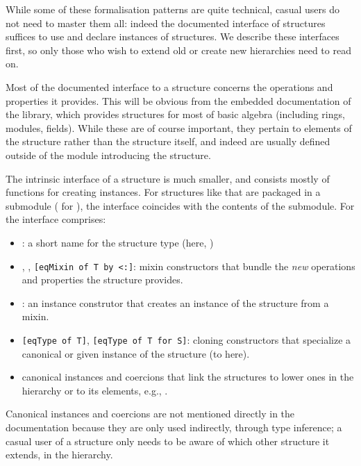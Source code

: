 While some of these formalisation patterns are quite technical, casual
users do not need to master them all: indeed the documented interface
of structures suffices to use and declare instances of structures. We
describe these interfaces first, so only those who wish to extend old
or create new hierarchies need to read on.

\label{str:itf}

Most of the documented interface to a structure concerns the operations and
properties it provides. This will be obvious from the embedded
documentation of the  library, which provides structures for
most of basic algebra (including rings, modules, fields). While these
are of course important, they pertain to elements of the structure
rather than the structure itself, and indeed are usually defined
outside of the module introducing the structure.

The intrinsic interface of a structure is much smaller, and consists mostly
of functions for creating instances. For structures like 
that are packaged in a submodule ( for ), the
interface coincides with the contents of the  submodule.
For  the interface comprises:
\begin{itemize}
\item {}: a short name for the structure type (here,
  )
\item {}, , \lstinline/[eqMixin of T by <:]/:
  mixin constructors that bundle the \emph{new} operations and
  properties the structure provides.
\item {}: an instance construtor that creates an instance of
  the structure from a mixin.  
\item \lstinline/[eqType of T]/, \lstinline/[eqType of T for S]/:
  cloning constructors that specialize a canonical or given instance
  of the structure (to  here).
\item canonical instances and coercions that link the structures to lower ones
  in the hierarchy or to its elements, e.g., .
\end{itemize}
Canonical instances and coercions are not mentioned directly in the
documentation because they are only used indirectly, through type
inference; a casual user of a structure only needs to be aware of which other
structure it extends, in the hierarchy.

